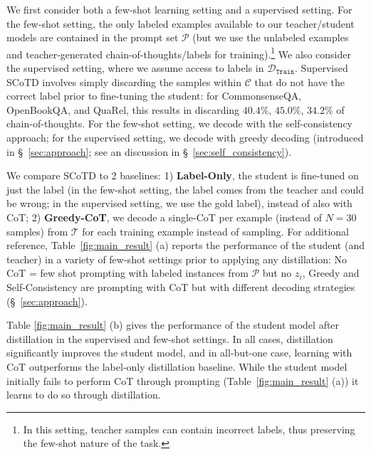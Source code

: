 \documentclass[11pt]{article}
\newcommand\jack[1]{{\color{orange}[#1]$_{Jack}$}}
\begin{document}
We first consider both a few-shot learning setting and a supervised setting. For the few-shot setting, the only labeled examples available to our teacher/student models are contained in the prompt set $\mathcal{P}$ (but we use the unlabeled examples and teacher-generated chain-of-thoughts/labels for training).\footnote{In this setting, teacher samples can contain incorrect labels, thus preserving the few-shot nature of the task.} We also consider the supervised setting, where we assume access to labels in $\mathcal{D}_{\texttt{Train}}$. Supervised SCoTD involves simply discarding the samples within $\mathcal{C}$ that do not have the correct label prior to fine-tuning the student: for CommonsenseQA, OpenBookQA, and QuaRel, this results in discarding $40.4\%$, $45.0\%$, $34.2\%$ of chain-of-thoughts. For the few-shot setting, we decode with the self-consistency approach; for the supervised setting, we decode with greedy decoding (introduced in \S~\ref{sec:approach}; see an discussion in \S~\ref{sec:self_consistency}).


We compare SCoTD to 2 baselines: %
1) \textbf{Label-Only}, the student is fine-tuned on just the label (in the few-shot setting, the label comes from the teacher and could be wrong; in the supervised setting, we use the gold label), instead of also with CoT;
2) \textbf{Greedy-CoT}, we decode a single-CoT per example (instead of $N=30$ samples) from $\mathcal{T}$ for each training example instead of sampling.
For additional reference, Table~\ref{fig:main_result} (a) reports the performance of the student (and teacher) in a variety of few-shot settings prior to applying any distillation: No CoT = few shot prompting with labeled instances from $\mathcal{P}$ but no $z_i$, Greedy and Self-Consistency are prompting with CoT but with different decoding strategies (\S~\ref{sec:approach}).

Table \ref{fig:main_result} (b) gives the performance of the student model after distillation in the supervised and few-shot settings. In all cases, distillation significantly improves the student model, and in all-but-one case, learning with CoT outperforms the label-only distillation baseline. While the student model initially fails to perform CoT through prompting (Table~\ref{fig:main_result} (a)) it learns to do so through distillation.
\end{document}
